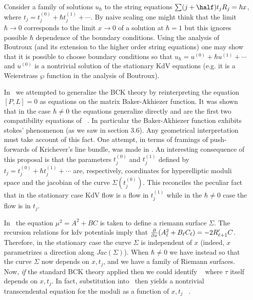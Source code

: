 Consider a family of solutions $u_\hbar$ to the 
string equations $\sum (j+\half)t_jR_j=\hbar x$, where
$t_j=t_j^{(0)}+\hbar t_j^{(1)}+\cdots$.
By naive scaling one might think that the 
limit $\hbar\to 0$ corresponds to the limit $x\to 0$ 
of a solution at $\hbar=1$ but 
this ignores possible $\hbar$ dependence of the boundary 
conditions. Using the analysis of Boutroux (and its 
extension to the higher order string equations) one may show
that it is possible to choose boundary conditions
so that $u_\hbar = u^{(0)}+\hbar u^{(1)}+\cdots$ and 
$u^{(0)}$ is a nontrivial solution of the stationary 
KdV equations (e.g. it is a Weierstrass $\wp$ function 
in the analysis of Boutroux). 

In \geom\ we attempted to generalize the BCK theory 
by reinterpreting the equation $[P,L]=0$ as equations 
on the matrix Baker-Akhiezer function.
It was shown 
that in the case $\hbar\not=0$ 
the equations generalize directly and are the first two compatibility 
equations of \linsys\ . 
In particular the Baker-Akhiezer function exhibits 
stokes' phenomenon (as we saw in section 3.6). Any
geometrical interpretation must take account of this 
fact. One attempt, in terms of framings of push-forwards
of Krichever's line bundle, was made in \geom .
An interesting consequence of this proposal is 
that the parameters $t_j^{(0)}$ and $t_j^{(1)}$ 
defined by $t_j=t_j^{(0)}+\hbar t_j^{(1)}+\cdots$
are, respectively, 
coordinates for hyperelliptic moduli space and the 
jacobian of the curve $\Sigma(t^{(0)}_j)$. This reconciles 
the peculiar fact that in the stationary case KdV flow 
is a flow in $t^{(1)}_j$ while in the $\hbar\not=0$ case 
the flow is in $t_j$. 

In \novikov\krich\ the equation $\mu^2=A^2+BC$ is 
taken to define a riemann surface $\Sigma$. 
The recursion relations for kdv 
potentials imply that
${\partial\over \partial x}(A_\ell^2+B_\ell C_\ell)=-2 R_{\ell+1}' C$.
Therefore, 
in the stationary 
case the curve $\Sigma$ is independent of 
$x$ (indeed, $x$ parametrizes a direction along 
$Jac(\Sigma)$). When $\hbar\not=0$ we have instead
\eqn{}
so that the curve $\Sigma$ now depends on $x,t_j$, and 
we have a family of Riemann surfaces. Now, {\it if} 
the standard BCK theory applied then we could
identify \BMN\  
\eqn{}
where $\tau$ itself depends on $x,t_j$. In fact,
substitution into \dercurv\ then yields 
a nontrivial transcendental equation for the moduli 
as a function of $x,t_j$ \novikov\krich\ . 

